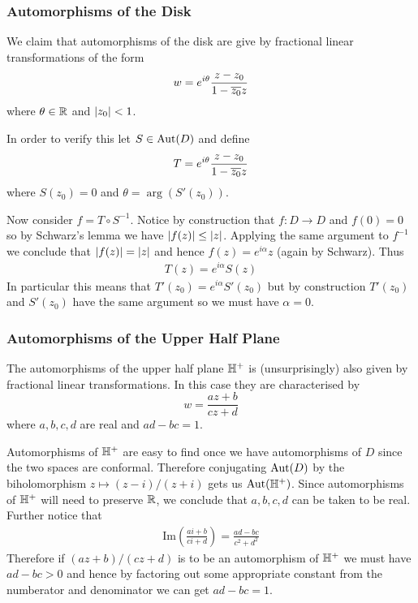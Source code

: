 \subsubsection{Automorphisms of the Disk}
We claim that automorphisms of the disk are give by fractional linear transformations of the form
$$w = e^{i \theta} \frac{z - z_0}{1 - \overline{z_0}z}$$
where $\theta \in \mathbb{R}$ and $\left|z_0\right| < 1$. 

In order to verify this let $S \in \text{Aut}(D)$ and define
$$T = e^{i \theta} \frac{z - z_0}{1 - \overline{z_0} z}$$
where $S(z_0) = 0$ and $\theta = \arg(S'(z_0))$.

Now consider $f = T \circ S^{-1}$. Notice by construction that $f: D \to D$ and $f(0) = 0$ so by Schwarz's lemma we have $\left|f(z)\right| \leq \left|z\right|$. Applying the same argument to $f^{-1}$ we conclude that $\left|f(z)\right| = \left|z\right|$ and hence $f(z) = e^{i \alpha}z$ (again by Schwarz). Thus 
\begin{align*}
    T(z) = e^{i\alpha} S(z)
\end{align*}
In particular this means that $T'(z_0) = e^{i \alpha} S'(z_0)$ but by construction $T'(z_0)$ and $S'(z_0)$ have the same argument so we must have $\alpha = 0$. 

\subsubsection{Automorphisms of the Upper Half Plane}
The automorphisms of the upper half plane $\mathbb{H}^+$ is (unsurprisingly) also given by fractional linear transformations. In this case they are characterised by 
$$w = \frac{az + b}{cz + d}$$
where $a, b, c, d$ are real and $ad - bc = 1$. 

Automorphisms of $\mathbb{H}^+$ are easy to find once we have automorphisms of $D$ since the two spaces are conformal. Therefore conjugating $\text{Aut}(D)$ by the biholomorphism $z \mapsto (z - i)/(z + i)$ gets us $\text{Aut}(\mathbb{H}^+)$. Since automorphisms of $\mathbb{H}^+$ will need to preserve $\mathbb{R}$, we conclude that $a, b, c, d$ can be taken to be real. Further notice that 
\begin{align*}
    \text{Im} \left( \frac{ai + b}{ci + d} \right) = \frac{ad - bc}{c^2 + d^2}
\end{align*}
Therefore if $(az + b)/(cz + d)$ is to be an automorphism of $\mathbb{H}^+$ we must have $ad - bc > 0$ and hence by factoring out some appropriate constant from the numberator and denominator we can get $ad - bc = 1$.  

